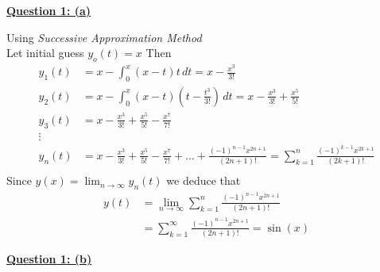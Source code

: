 \documentclass[]{article}
\begin{document}
\textbf{\underline{Question 1: (a)}}
\begin{adjustwidth}{1cm}{2cm}
    Using \textit{Successive Approximation Method}\\
    Let initial guess $\displaystyle y_{o}(t) =x$ Then
    \begin{align*}
        y_1(t) & = x -\int_0^x (x-t)t \, dt = x-\frac{x^3}{3!}                                                                                                \\
        y_2(t) & = x -\int_0^x (x-t)(t-\frac{t^3}{3!})\, dt = x-\frac{x^3}{3!}+\frac{x^5}{5!}                                                                 \\
        y_3(t) & = x-\frac{x^3}{3!}+\frac{x^5}{5!}-\frac{x^7}{7!}                                                                                             \\
        \vdots &                                                                                                                                              \\
        y_n(t) & =x-\frac{x^3}{3!}+\frac{x^5}{5!}-\frac{x^7}{7!}+\dots+ \frac{(-1)^{n-1}x^{2n+1}}{(2n+1)!} = \sum_{k=1}^{n}\frac{(-1)^{k-1}x^{2k+1}}{(2k+1)!} \\
    \end{align*}
    Since $\displaystyle y(x) = \lim_{n \to \infty} y_n(t)$ we deduce that
    \begin{align*}
        y(t) & =\lim_{n \to \infty}\sum_{k=1}^{n} \frac{(-1)^{n-1}x^{2n+1}}{(2n+1)!} \\
             & =\sum_{k=1}^{\infty} \frac{(-1)^{n-1}x^{2n+1}}{(2n+1)!} = \sin(x)
    \end{align*}
\end{adjustwidth}
\textbf{\underline{Question 1: (b)}}
\end{document}
